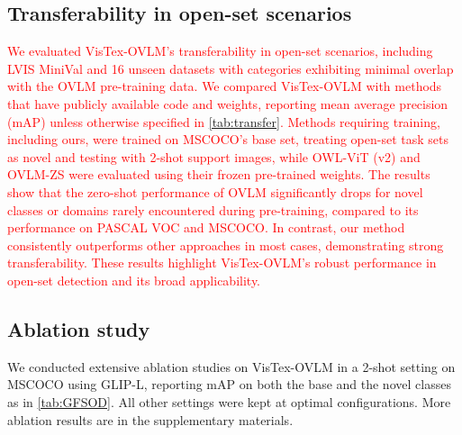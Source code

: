 \documentclass[10pt,twocolumn,letterpaper]{article}
\begin{document}
\subsection{Transferability in open-set scenarios}
\label{sec:4.4}

\textcolor{red}{We evaluated VisTex-OVLM’s transferability in open-set scenarios, including LVIS MiniVal and 16 unseen datasets with categories exhibiting minimal overlap with the OVLM pre-training data. We compared VisTex-OVLM with methods that have publicly available code and weights, reporting mean average precision (mAP) unless otherwise specified in \cref{tab:transfer}. Methods requiring training, including ours, were trained on MSCOCO’s base set, treating open-set task sets as novel and testing with 2-shot support images, while OWL-ViT (v2) and OVLM-ZS were evaluated using their frozen pre-trained weights. The results show that the zero-shot performance of OVLM significantly drops for novel classes or domains rarely encountered during pre-training, compared to its performance on PASCAL VOC and MSCOCO.  In contrast, our method consistently outperforms other approaches in most cases, demonstrating strong transferability. These results highlight VisTex-OVLM’s robust performance in open-set detection and its broad applicability.}

\subsection{Ablation study}
We conducted extensive ablation studies on VisTex-OVLM in a 2-shot setting on MSCOCO using GLIP-L, reporting mAP on both the base and the novel classes as in \cref{tab:GFSOD}. All other settings were kept at optimal configurations. More ablation results are in the supplementary materials.
\end{document}
